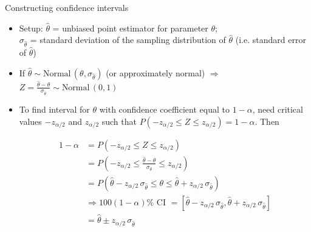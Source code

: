 \documentclass{article}
\newcommand{\follow}[1]{\sim \text{#1}\,}		%
\begin{document}
Constructing confidence intervals
\begin{itemize}    
    \item Setup: $\hat{\theta}$ = unbiased point estimator for parameter $\theta$; \\ $\sigma_{\hat{\theta}}$ = standard deviation of the sampling distribution of $\hat{\theta}$ (i.e. standard error of $\hat{\theta}$)
    \item[] If $\hat{\theta} \follow{Normal}(\theta, \sigma_{\hat{\theta}})$ (or approximately normal) $\Longrightarrow$ $Z = \frac{\hat{\theta} - \theta}{\sigma_{\hat{\theta}}} \follow{Normal}(0,1)$
    \item To find interval for $\theta$ with confidence coefficient equal to $1 - \alpha$, need critical values $-z_{\alpha / 2}$ and $z_{\alpha / 2}$ such that $P(-z_{\alpha / 2} \le Z \le z_{\alpha / 2}) = 1 - \alpha$. Then 
    
        \begin{align*}
         1 - \alpha &= P(-z_{\alpha / 2} \le Z \le z_{\alpha / 2}) \\
             &= P(-z_{\alpha / 2} \le \frac{\hat{\theta} - \theta}{\sigma_{\hat{\theta}}} \le z_{\alpha / 2}) \\
             & = P(\hat{\theta} - z_{\alpha / 2} \, \sigma_{\hat{\theta}} \le \theta \le \hat{\theta} + z_{\alpha / 2} \, \sigma_{\hat{\theta}}) \\
             &\Longrightarrow 100 (1 - \alpha)\% \text{ CI } = [\hat{\theta} - z_{\alpha / 2} \, \sigma_{\hat{\theta}}, \hat{\theta} + z_{\alpha / 2} \, \sigma_{\hat{\theta}}] \\
             &= \hat{\theta} \pm z_{\alpha / 2} \, \sigma_{\hat{\theta}} \\
    \end{align*}


\end{itemize}
\end{document}
